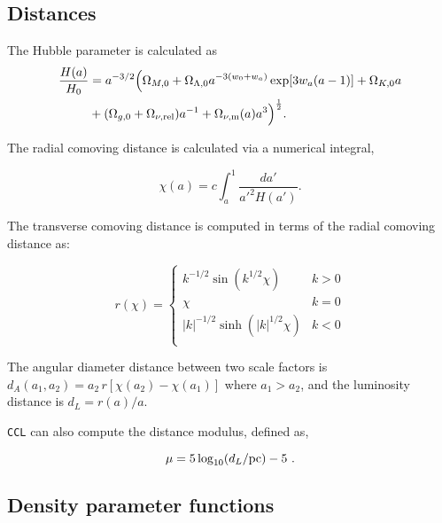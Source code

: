 \documentclass[\docopts]{\docclass}
\newcommand{\ccl}{{\tt CCL}\xspace}
\begin{document}
\subsection{Distances}
\label{sec:distances}

The Hubble parameter is calculated as
%
\begin{align}\label{eq:Ha}
\frac{H(a)}{H_0} &= a^{-3/2}\Big(\Omega_{M,0}+\Omega_{\Lambda,0} a^{-3(w_0+w_a)}
    \exp[3 w_a (a-1)]+\Omega_{K,0} a \nonumber \\
    &+(\Omega_{g,0} + \Omega_{\nu, {\rm rel}}) a^{-1} + \Omega_{\nu, {\rm m}}(a)a^3\Big)^{\frac{1}{2}}.
\end{align}

The radial comoving distance is calculated via a numerical integral,

\begin{equation}
 \chi(a)= c \int_a^1 \frac{da'}{a'^2 H(a')}.
\end{equation}

The transverse comoving distance is computed in terms of the radial comoving distance as:

\begin{equation}\label{eq:angdist}
 r(\chi)=\left\{\begin{array}{cc}
                 k^{-1/2}\sin(k^{1/2}\chi) & k>0\\
                 \chi & k=0\\
                 |k|^{-1/2}\sinh(|k|^{1/2}\chi) & k<0\\
                \end{array}\right.
\end{equation}

The angular diameter distance between two scale factors is
$d_A(a_1,a_2)=a_2\,r[\chi(a_2)-\chi(a_1)]$ where $a_1>a_2$, and the luminosity distance is
$d_L=r(a)/a$.

\ccl can also compute the distance modulus, defined as,

\begin{equation}\label{eq:distmod}
    \mu = 5 \log_{10}(d_L / {\rm pc})-5\ .
\end{equation}

\subsection{Density parameter functions}
\label{subsec:densityparam}
\end{document}
